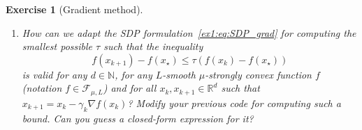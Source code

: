\documentclass[11pt,a4paper]{article}
\newtheorem{exercise}{Exercise}
\begin{document}
\begin{exercise}[Gradient method]
\begin{enumerate}
	For going further: a dual problem is given by
	\begin{equation}\label{eq:ex1_dual2}	 
		\begin{aligned}
			\min_{\tau,\lambda_1,\lambda_2\geqslant 0} & \,\tau\\
			\text{s.t. }& S=\begin{bmatrix}
		\tau+\lambda_1 \frac{(1-\gamma_k L)(1-\gamma_k \mu)}{L-\mu} & -\lambda_1\frac{2-\gamma_k(L+\mu)}{2(L-\mu)}\\
		-\lambda_1\frac{2-\gamma_k(L+\mu)}{2(L-\mu)} & \frac{\lambda_1}{L-\mu}-1
			\end{bmatrix}\succcurlyeq 0\\
			&0=\lambda_1-\lambda_2.
		\end{aligned}
		\end{equation} Is there a simple closed-form solution for this problem? 
	\item How can we adapt the SDP formulation~\eqref{ex1:eq:SDP_grad} for computing the smallest possible $\tau$ such that the inequality
	\[ f(x_{k+1})-f(x_\star) \leqslant \tau (f(x_{k})-f(x_\star))\]
	is valid for any $d\in\mathbb{N}$, for any $L$-smooth $\mu$-strongly convex function $f$ (notation $f\in\mathcal{F}_{\mu,L}$) and for all $x_k,x_{k+1}\in\mathbb{R}^d$ such that $x_{k+1}=x_k-\gamma_k \nabla f(x_k)$? Modify your previous code for computing such a bound. Can you guess a closed-form expression for it?
	

\end{enumerate}
\end{exercise}
\end{document}
